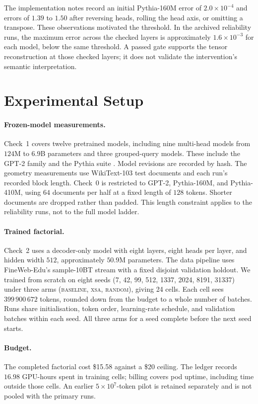 \documentclass{article} %
\begin{document}
The implementation notes record an initial Pythia-160M error of
$2.0\times10^{-4}$ and errors of $1.39$ to $1.50$ after reversing heads,
rolling the head axis, or omitting a transpose. These observations motivated
the threshold. In the archived reliability runs, the maximum error across
the checked layers is approximately $1.6\times10^{-3}$ for each model,
below the same threshold. A passed gate supports the tensor reconstruction
at those checked layers; it does not validate the intervention's semantic
interpretation.

\section{Experimental Setup}

\paragraph{Frozen-model measurements.} Check~1 covers twelve pretrained
models, including nine multi-head models from $124$M to $6.9$B parameters
and three grouped-query models. These include the GPT-2
family \citep{radford2019language} and the Pythia suite
\citep{biderman2023pythia}. Model revisions are recorded by hash. The
geometry measurements use WikiText-103 test documents and each run's recorded
block length. Check~0 is restricted to GPT-2, Pythia-160M, and Pythia-410M,
using $64$ documents per half at a fixed length of $128$ tokens. Shorter
documents are dropped rather than padded. This length constraint applies to
the reliability runs, not to the full model ladder.

\paragraph{Trained factorial.} Check~2 uses a decoder-only model with eight
layers, eight heads per layer, and hidden width $512$, approximately $50.9$M
parameters. The data pipeline uses FineWeb-Edu's sample-10BT stream with a
fixed disjoint validation holdout. We trained from scratch on eight seeds
(7, 42, 99, 512, 1337, 2024, 8191, 31337) under three
arms (\textsc{baseline}, \textsc{xsa}, \textsc{random}), giving 24 cells.
Each cell sees $399\,900\,672$ tokens, rounded down from the budget to a
whole number of batches. Runs share initialisation, token order, learning-rate
schedule, and validation batches within each seed. All three arms for a seed
complete before the next seed starts.

\paragraph{Budget.} The completed factorial cost \$15.58 against a \$20
ceiling. The ledger records $16.98$ GPU-hours spent in training cells;
billing covers pod uptime, including time outside those cells. An earlier
$5\times10^{7}$-token pilot is retained separately and is not pooled with
the primary runs.
\end{document}
